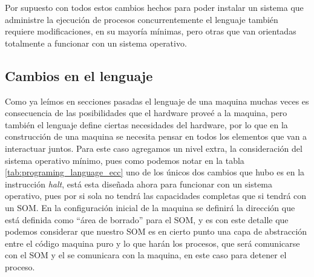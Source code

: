\documentclass[letterpaper,12pt,oneside]{book}
\begin{document}
		Por supuesto con todos estos cambios hechos para poder instalar un sistema que administre la ejecución de procesos concurrentemente el lenguaje también
		requiere modificaciones, en su mayoría mínimas, pero otras que van orientadas totalmente a funcionar con un sistema operativo.
		
		\subsection{Cambios en el lenguaje}
		
		Como ya leímos en secciones pasadas el lenguaje de una maquina muchas veces es consecuencia de las posibilidades que el hardware proveé a la maquina, pero
		también el lenguaje define ciertas necesidades del hardware, por lo que en la construcción de una maquina se necesita pensar en todos
		los elementos que van a interactuar juntos. Para este caso agregamos un nivel extra, la consideración del sistema operativo mínimo, pues como
		podemos notar en la tabla \ref{tab:programing_language_ecc} uno de los únicos dos cambios que hubo es en la instrucción \textit{halt}, está
		esta diseñada ahora para funcionar con un sistema operativo, pues por si sola no tendrá las capacidades completas que si tendrá con un SOM. En la
		configuración inicial de la maquina se definirá la dirección que está definida como ``área de borrado'' para el SOM, y es con este detalle
		que podemos considerar que nuestro SOM es en cierto punto una capa de abstracción entre el código maquina puro y lo que harán los procesos,
		que será comunicarse con el SOM y el se comunicara con la maquina, en este caso para detener el proceso.

		
		
\end{document}
